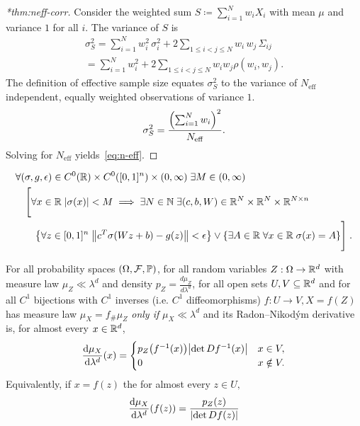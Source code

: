 \begin{proof}[*thm:neff-corr]
            Consider the weighted sum $S \coloneqq \sum_{i=1}^N w_i X_i$ with mean $\mu$ and variance \(1\) for all $i$.
            The variance of \(S\) is
            \begin{gather}
                \sigma^2_S = \sum_{i=1}^N w_i^2\,\sigma^2_i + 2\sum_{1\le i<j\le N} w_i\, w_j\,{\Sigma}_{ij}\\
                = \sum_{i=1}^N w_i^2 + 2\sum_{1\le i<j\le N} w_i w_j\rho(w_i,w_j).
            \end{gather}
            The definition of effective sample size equates $\sigma^2_S$ to the variance of $N_{\mathrm{eff}}$ independent, equally weighted observations of variance $1$.
            \[
                \sigma^2_S = \frac{\qty(\sum_{i=1}^N w_i)^2}{ N_{\mathrm{eff}}}.
            \]
            Solving for $N_{\mathrm{eff}}$ yields~\cref{eq:n-eff}.
            \end{proof}



\begin{theorem}
\noproofref
            \noproofref
            
        \begin{align}
            &\forall (\sigma, g, \epsilon)\in C^0(\R)\times C^0([0, 1]^n)\times (0,\infty)\;\exists M\in(0, \infty)\\
            \nonumber&\quad \Bigg[\forall x\in\R\;|\sigma(x)| < M \implies \exists N\in\mathbb{N}\;\exists (c, b, W)\in \R^N\times \R^N\times \R^{N\times n}\\
            \nonumber&\qquad\qty{\forall z\in[0, 1]^n\;\norm{c^T\sigma(Wz + b) - g(z)} <\epsilon} \lor \qty{\exists A\in\R\;\forall x\in\R\;\sigma(x) = A}\Bigg]\;.
            \end{align}
        \end{theorem}

\begin{theorem}
\noproofref
            For all probability spaces \((\Omega,\mathcal{F},\P)\), for all random variables \(Z:\Omega\to\R^d\) with measure law \(\mu_Z\ll\lambda^d\) and density \(p_Z=\frac{d\mu_Z}{d\lambda^d}\), for all open sets \(U,V\subseteq\R^d\) and for all \(C^1\) bijections with \(C^1\) inverses (i.e. \(C^1\) diffeomorphisms) \(f:U\to V, X=f(Z)\) has measure law \(\mu_X=f_{\#}\mu_Z\) \emph{only if} \(\mu_X\ll\lambda^d\) and its Radon--Nikod\'ym derivative~\cite{fremlin_measure_2000, noauthor_measure_nodate} is, for almost every $x\in\R^d$,
        \[
            \frac{\dd\mu_X}{\dd\lambda^d}(x) =
            \begin{cases}
                p_Z \qty(f\inv(x))\qty|\det D f^{-1}(x)| & x\in V,\\
                0                                       & x\notin V.
        \end{cases}
        \]
        Equivalently, if $x=f(z)$ the for almost every \(z\in U,\)
        \[
        \frac{\dd\mu_X}{\dd\lambda^d}\qty(f(z))
        =
        \frac{p_Z(z)}{\qty|\det D f(z)|}
        \]
        \end{theorem}


